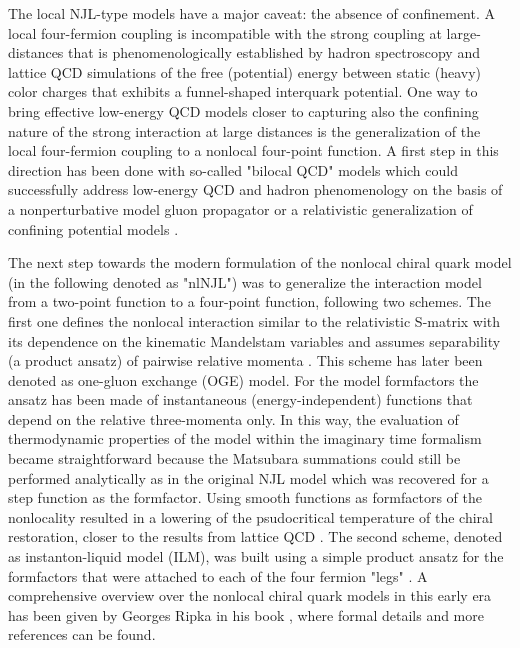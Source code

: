 \documentclass[%
 reprint,
superscriptaddress,
nofootinbib,
 amsmath,amssymb,
 aps,
]{revtex4-1}
\begin{document}
The local NJL-type models have a major caveat: the absence of confinement. A local four-fermion coupling is incompatible with the strong coupling at large-distances 
that is phenomenologically established by hadron spectroscopy and lattice QCD simulations of the free (potential) energy between static (heavy) color charges
that exhibits a funnel-shaped interquark potential.
One way to bring effective low-energy QCD models closer to capturing also the confining nature of the strong interaction at large distances is the generalization of the local four-fermion coupling to a nonlocal four-point function.
A first step in this direction has been done with so-called "bilocal QCD" models \cite{Kleinert:1976ds,Ebert:1976rh}
which could successfully address low-energy QCD and hadron phenomenology on the basis of a nonperturbative model gluon propagator \cite{Cahill:1985mh} or a relativistic generalization of confining potential models \cite{Pervushin:1989ee}.

The next step towards the modern formulation of the nonlocal chiral quark model (in the following denoted as "nlNJL") was to generalize the interaction model from a two-point function to a four-point function, following two schemes. 
The first one defines the nonlocal interaction similar to the relativistic S-matrix with its dependence on the kinematic Mandelstam variables and assumes separability (a product ansatz) of pairwise relative momenta \cite{Schmidt:1994di}.  
This scheme has later been denoted as one-gluon exchange (OGE) model.
For the model formfactors the ansatz has been made of instantaneous (energy-independent) functions that depend on the relative three-momenta only. In this way, the evaluation of thermodynamic properties of the model within the imaginary time formalism became straightforward because the Matsubara summations could still be performed analytically as in the original NJL model
which was recovered for a step function as the formfactor. 
Using smooth functions as formfactors of the nonlocality resulted in a lowering of the psudocritical temperature of the chiral restoration, closer to the results from lattice QCD \cite{Schmidt:1994di}. 
The second scheme, denoted as instanton-liquid model (ILM), was built using a simple product ansatz for the formfactors that were attached to each of the four fermion "legs"
\cite{Bowler:1994ir}.
A comprehensive overview over the nonlocal chiral quark models in this early era has been given by Georges Ripka in his book 
\cite{Ripka:1997zb}, where formal details and more references can be found.
\end{document}

